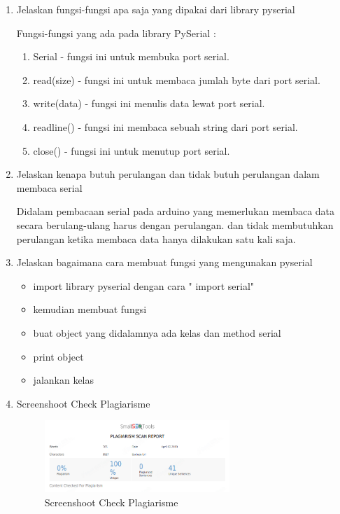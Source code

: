 \begin{enumerate}
	\item Jelaskan fungsi-fungsi apa saja yang dipakai dari library pyserial
	
\par Fungsi-fungsi yang ada pada library PySerial :

\begin{enumerate}
	\item Serial - fungsi ini untuk membuka port serial.
	\item read(size) - fungsi ini untuk membaca jumlah byte dari port serial.
	\item write(data) - fungsi ini menulis data lewat port serial.
	\item readline() - fungsi ini membaca sebuah string dari port serial.
	\item close() - fungsi ini untuk menutup port serial.
\end{enumerate}

	\item Jelaskan kenapa butuh perulangan dan tidak butuh perulangan dalam membaca serial
	
	\par Didalam pembacaan serial pada arduino yang memerlukan membaca data secara berulang-ulang harus dengan perulangan. dan tidak membutuhkan perulangan ketika membaca data hanya dilakukan satu kali saja.
	
	\item Jelaskan bagaimana cara membuat fungsi yang mengunakan pyserial
	\begin{itemize}
	\item import library pyserial dengan cara " import serial"
	\item kemudian membuat fungsi
	\item buat object yang didalamnya ada kelas dan method serial
	\item print object
	\item jalankan kelas
	\end{itemize}	
	
	\item Screenshoot Check Plagiarisme

\begin{figure}[ht]
 \includegraphics[width=7cm]{figures/5/1174087/Teori/plg.png}
 \centering
 \caption{Screenshoot Check Plagiarisme}
\end{figure}	
	
	\end{enumerate}

